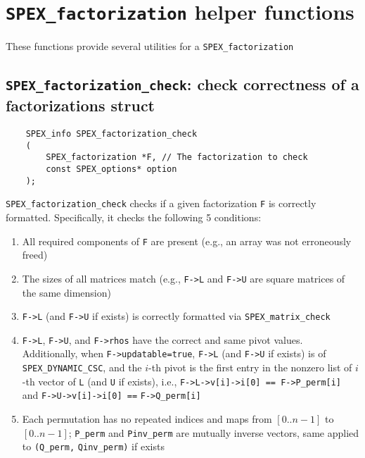 \documentclass[12pt]{report}
\theoremstyle{definition}
\begin{document}
\section{\texttt{SPEX\_factorization} helper functions} \label{s:spex_factorization_helper}

These functions provide several utilities for a \verb|SPEX_factorization|

\subsection{\texttt{SPEX\_factorization\_check}: check correctness of a factorizations struct}\label{ss:spex_factorization_check}

\begin{mdframed}[userdefinedwidth=6in]
{\footnotesize
\begin{verbatim}
    SPEX_info SPEX_factorization_check
    (
        SPEX_factorization *F, // The factorization to check
        const SPEX_options* option
    );
\end{verbatim}
} \end{mdframed}

\verb|SPEX_factorization_check| checks if a given factorization \verb|F| is correctly formatted. Specifically, it checks the following 5 conditions:
\begin{enumerate}
    \item All required components of \verb|F| are present (e.g., an array was not erroneously freed)
    \item The sizes of all matrices match (e.g., \verb|F->L| and \verb|F->U| are square matrices of the same dimension)
    \item \verb|F->L| (and \verb|F->U| if exists) is correctly formatted via \verb|SPEX_matrix_check|
    \item \verb|F->L|, \verb|F->U|, and \verb|F->rhos| have the correct and same pivot values. Additionally, when \verb|F->updatable=true|, \verb|F->L| (and \verb|F->U| if exists) is of \verb|SPEX_DYNAMIC_CSC|, and the $i$-th pivot is the first entry in the nonzero list of $i$-th vector of \verb|L| (and \verb|U| if exists), i.e., \verb|F->L->v[i]->i[0] == F->P_perm[i]| and \verb|F->U->v[i]->i[0] ==| \verb|F->Q_perm[i]|
    \item Each permutation has no repeated indices and maps from $[0..n-1]$ to $[0..n-1]$; \verb|P_perm| and \verb|Pinv_perm| are mutually inverse vectors, same applied to \verb|(Q_perm,| \verb|Qinv_perm)| if exists
\end{enumerate}
\end{document}
